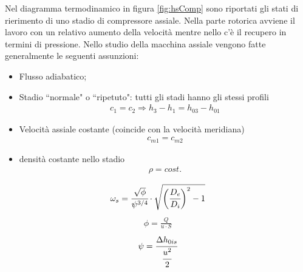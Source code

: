 Nel diagramma termodinamico in figura \ref{fig:hsComp} sono riportati gli stati di rierimento di uno stadio di compressore assiale. Nella parte rotorica avviene il lavoro con un relativo aumento della velocità mentre nello c'è il recupero in termini di pressione. Nello studio della macchina assiale vengono fatte generalmente le seguenti assunzioni:
\begin{itemize}
\item Flusso adiabatico;
\item Stadio ``normale" o ``ripetuto": tutti gli stadi hanno gli stessi profili
\begin{align*}
c_1 = c_2 \Rightarrow h_3-h_1 = h_{03} - h_{01}
\end{align*}
\item Velocità assiale costante (coincide con la velocità meridiana)
\begin{align*}
c_{m1} = c_{m2}
\end{align*}
\item densità costante nello stadio
\begin{align*}
\rho = cost. 
\end{align*}
\end{itemize}
\begin{align*}
\omega_s = \cfrac{\sqrt{\phi}}{\psi^{3/4}} \cdot \sqrt{\bigg( \cfrac{D_e}{D_i} \bigg)^2 -1}
\end{align*}
\begin{align*}
\phi = \frac{Q}{u \cdot S}
\end{align*}
\begin{align*}
\psi = \cfrac{\Delta h_{0is}}{\cfrac{u^2}{2}}
\end{align*}
